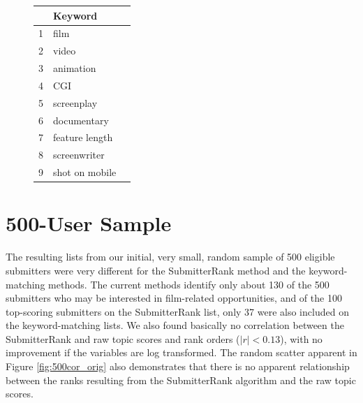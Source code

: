 \documentclass[]{report}   %
\begin{document}
\begin{figure}[h]
\centering
\begin{minipage}{0.45\textwidth}
\captionsetup{font=scriptsize}
\centering
{}
\label{table:filmkeys}
\begin{tabular}{rlr}
  \hline
 & Keyword \\ 
  \hline
1 & film \\ 
  2 & video \\ 
  3 & animation \\ 
  4 & CGI\\ 
  5 & screenplay \\ 
  6 & documentary \\ 
  7 & feature length \\ 
  8 & screenwriter \\ 
  9 & shot on mobile\\ 
   \hline
\end{tabular}
\end{minipage}
\end{figure}

\section{500-User Sample}

The resulting lists from our initial, very small, random sample of 500 eligible submitters were very different for the SubmitterRank method and the keyword-matching methods. The current methods identify only about 130 of the 500 submitters who may be interested in film-related opportunities, and of the 100 top-scoring submitters on the SubmitterRank list, only 37 were also included on the keyword-matching lists. We also found basically no correlation between the SubmitterRank and raw topic scores and rank orders ($|r|<0.13$), with no improvement if the variables are log transformed. The random scatter apparent in Figure \ref{fig:500cor_orig} also demonstrates that there is no apparent relationship between the ranks resulting from the SubmitterRank algorithm and the raw topic scores.
\end{document}
